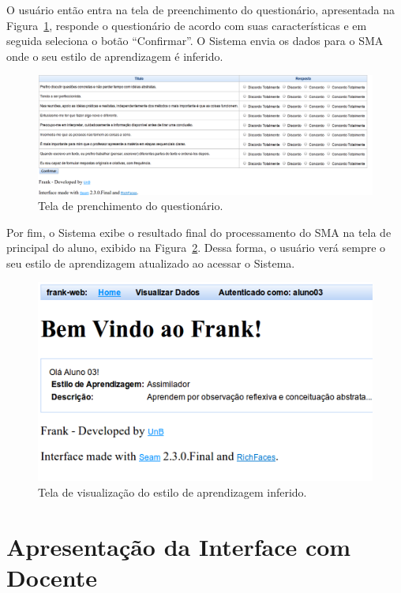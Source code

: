 O usuário então entra na tela de preenchimento do questionário, apresentada na Figura~\ref{fig:frank-tela-aluno-preencher-questionario}, responde o questionário de acordo com suas características e em seguida seleciona o botão ``Confirmar''. O Sistema envia os dados para o SMA onde o seu estilo de aprendizagem é inferido.

\begin{figure}
	\centering
	\includegraphics[scale=0.4]{images/frank-tela-aluno-preencher-questionario.png}
	\caption{Tela de prenchimento do questionário.}
	\label{fig:frank-tela-aluno-preencher-questionario}
\end{figure}

Por fim, o Sistema exibe o resultado final do processamento do SMA na tela de principal do aluno, exibido na Figura~\ref{fig:frank-tela-aluno-inferencia-estilo}. Dessa forma, o usuário verá sempre o seu estilo de aprendizagem atualizado ao acessar o Sistema.

\begin{figure}
	\centering
	\includegraphics[scale=0.6]{images/frank-tela-aluno-inferencia-estilo.png}
	\caption{Tela de visualização do estilo de aprendizagem inferido.}
	\label{fig:frank-tela-aluno-inferencia-estilo}
\end{figure}

\section{Apresentação da Interface com Docente}\label{section:interface-docente}

